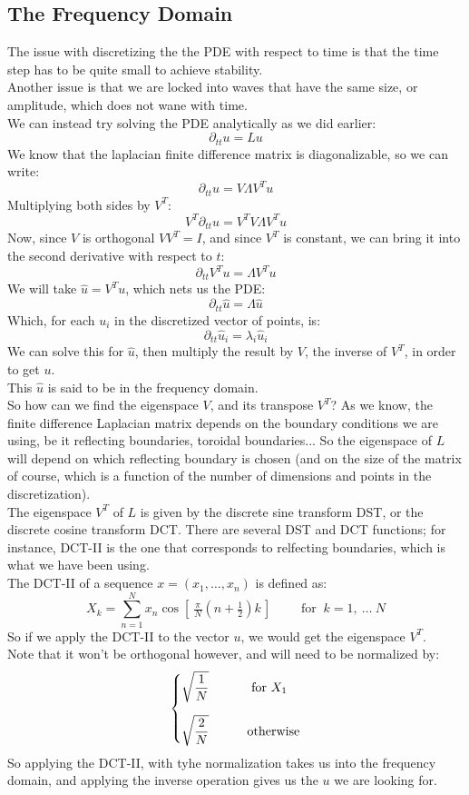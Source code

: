 \documentclass[12pt]{article}
\begin{document}
\newpage 

\subsection*{The Frequency Domain}

The issue with discretizing the the PDE
with respect to time is that the time step
has to be quite small to achieve stability. \\
Another issue is that we are locked into
waves that have the same size, or amplitude,
which does not wane with time. \\

We can instead try solving the PDE
analytically as we did earlier:
\[ \partial_{tt}u = Lu \]
We know that the laplacian finite difference
matrix is diagonalizable, so we can write:
\[ \partial_{tt}u = V\Lambda V^T u \]
Multiplying both sides by $V^T$:
\[ V^T\partial_{tt}u = V^TV\Lambda V^T u \]
Now, since $V$ is orthogonal $VV^T = I$,
and since $V^T$ is constant, we can
bring it into the second derivative
with respect to $t$:
\[ \partial_{tt} V^Tu = \Lambda V^T u \]
We will take $\hat{u} = V^T u$,
which nets us the PDE:
\[ \partial_{tt} \hat{u} = \Lambda \hat{u} \]
Which, for each $u_i$ in the discretized vector
of points, is:
\[ \partial_{tt} \hat{u}_i = \lambda_i \hat{u}_i \]
We can solve this for $\hat{u}$,
then multiply the result by $V$,
the inverse of $V^T$, in order to get $u$. \\
This $\hat{u}$ is said to be in the frequency 
domain. \\

So how can we find the eigenspace $V$, 
and its transpose $V^T$?
As we know, the finite difference Laplacian matrix
depends on the boundary conditions we are using,
be it reflecting boundaries, toroidal boundaries...
So the eigenspace of $L$
will depend on which reflecting boundary is
chosen (and on the size of the matrix of course,
which is a function of the number of dimensions
and points in the discretization). \\

The eigenspace $V^T$ of $L$ is given by the 
discrete sine transform DST, or the discrete
cosine transform DCT.
There are several DST and DCT functions;
for instance, DCT-II is the one that
corresponds to relfecting boundaries, which is
what we have been using. \\

The DCT-II of a sequence 
$x = (x_1, \dots, x_n)$ is defined as:
\[ {X_{k}=\sum _{n=1}^{N}x_{n}\cos 
\left[\,{\tfrac {\,\pi \,}{N}}
\left(n+{\tfrac {1}{2}}\right)k\,
\right]\qquad {\text{ for }}~k=1,\ 
\dots \ N}\]
So if we apply the DCT-II to the vector $u$,
we would get the eigenspace $V^T$. \\
Note that it won't be orthogonal however,
and will need to be normalized by:
\[ \piecewise{
    \sqrt{\dfrac{1}{N}} \qquad & \FOR X_1 \vs{10} \\
    \sqrt{\dfrac{2}{N}} \qquad & \text{otherwise}
} \]
So applying the DCT-II, with tyhe normalization
takes us into the frequency domain, and
applying the inverse operation gives us the $u$
we are looking for. \\
\end{document}
